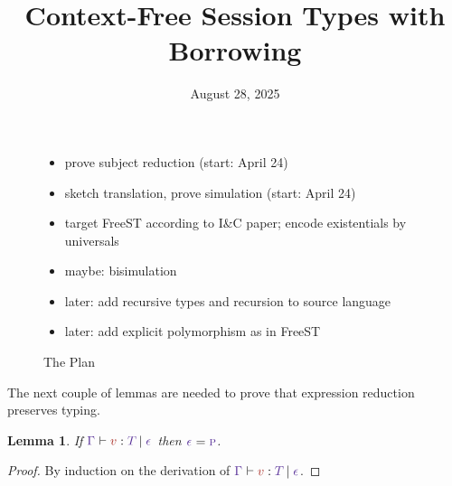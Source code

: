 \documentclass{article}
\title{Context-Free Session Types with Borrowing}
\date{August 28, 2025}
\newtheorem{lemma}{Lemma}
\begin{document}
\maketitle

\begin{figure}[tp]
  \begin{itemize}
  \item prove subject reduction (start: April 24)
  \item sketch translation, prove simulation (start: April 24)
  \item target FreeST according to I\&C paper; encode existentials by
    universals
  \item maybe: bisimulation
  \item later: add recursive types and recursion to source language
  \item later: add explicit polymorphism as in FreeST
  \end{itemize}
  \caption{The Plan}
  \label{fig:the-plan}
\end{figure}


The next couple of lemmas are needed to prove that
expression reduction preserves typing.

\begin{lemma}
  If $\HasType {\Ctx} {\V} {\T} {\Eff}$
  then $\Eff = \EffPure$.
\end{lemma}
\begin{proof}
  By induction on the derivation of $\HasType {\Ctx} {\V} {\T} {\Eff}$.
\end{proof}
\end{document}
